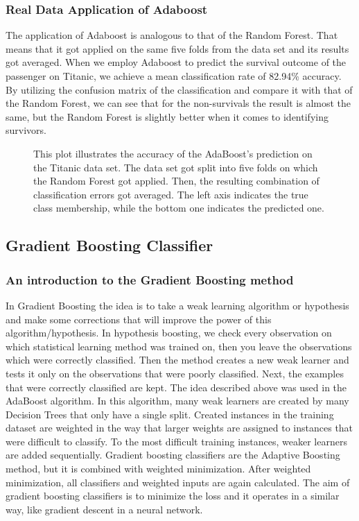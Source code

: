 \subsubsection{Real Data Application of Adaboost}
The application of Adaboost is analogous to that of the Random Forest. 
That means that it got applied on the same five folds from the data set and its results got averaged.
When we employ Adaboost to predict the survival outcome of the passenger on Titanic, 
we achieve a mean classification rate of 82.94\% accuracy. By utilizing the confusion matrix of the classification 
and compare it with that of the Random Forest, we can see that for the non-survivals the result is almost the same,
but the Random Forest is slightly better when it comes to identifying survivors.

\begin{figure}[H]
    \captionsetup{format=plain}
    \caption
        {This plot illustrates the accuracy of the AdaBoost's prediction on the Titanic data set.
        The data set got split into five folds on which the Random Forest got applied. 
        Then, the resulting combination of classification errors got averaged.
        The left axis indicates the true class membership, while the bottom one indicates the predicted one.
        }
    \label{fig:confusion_matrix_adaboost}
\end{figure}


\subsection{Gradient Boosting Classifier}
\label{sec:gradient_boosting}

\subsubsection{An introduction to the Gradient Boosting method}
In Gradient Boosting the idea is to take a weak learning algorithm or hypothesis and make some corrections that will improve the power of this algorithm/hypothesis. In hypothesis boosting, we check every observation on which statistical learning method was trained on,
then you leave the observations which were correctly classified. Then the method creates a new weak learner and tests it only on the observations that were poorly classified. Next, the examples that were correctly classified are kept. The idea described above was used in the AdaBoost algorithm. In this algorithm, many weak learners are created by many Decision Trees that only have a single split. Created instances in the training dataset are weighted in the way that larger weights are assigned to instances that were difficult to classify. To the most difficult training instances, weaker learners are added sequentially. Gradient boosting classifiers are the Adaptive Boosting method, but it is combined with weighted minimization. After weighted minimization, all classifiers and weighted inputs are again calculated. The aim of gradient boosting classifiers is to minimize the loss and it operates in a similar way, like gradient descent in a neural network.

